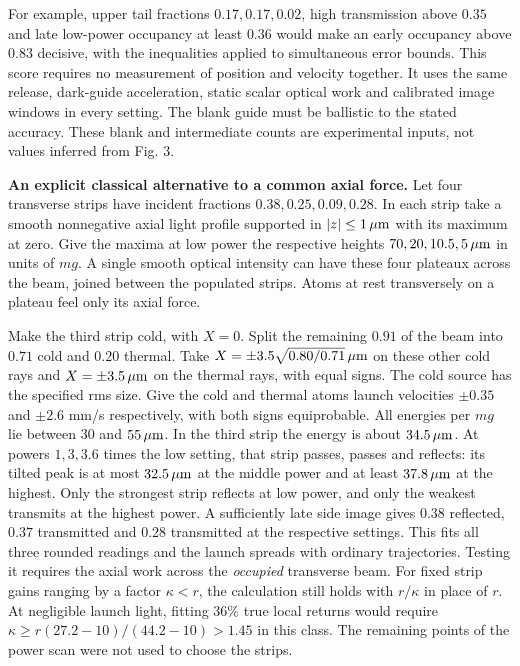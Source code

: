 \documentclass[11pt,a4paper]{article}
\begin{document}
For example, upper tail fractions \(0.17,0.17,0.02\), high transmission
above \(0.35\) and late low-power occupancy at least \(0.36\) would make
an early occupancy above \(0.83\) decisive, with the inequalities
applied to simultaneous error bounds. This score requires no measurement
of position and velocity together. It uses the same release, dark-guide
acceleration, static scalar optical work and calibrated image windows in
every setting. The blank guide must be ballistic to the stated accuracy.
These blank and intermediate counts are experimental inputs, not values
inferred from Fig. 3.

\textbf{An explicit classical alternative to a common axial force.} Let
four transverse strips have incident fractions \(0.38,0.25,0.09,0.28\).
In each strip take a smooth nonnegative axial light profile supported in
\(|z|\le1\,\mu{\rm m}\) with its maximum at zero. Give the maxima at low
power the respective heights \(70,20,10.5,5\,\mu{\rm m}\) in units of
\(mg\). A single smooth optical intensity can have these four plateaux
across the beam, joined between the populated strips. Atoms at rest
transversely on a plateau feel only its axial force.

Make the third strip cold, with \(X=0\). Split the remaining \(0.91\) of
the beam into \(0.71\) cold and \(0.20\) thermal. Take
\(X=\pm3.5\sqrt{0.80/0.71}\,\mu{\rm m}\) on these other cold rays and
\(X=\pm3.5\,\mu{\rm m}\) on the thermal rays, with equal signs. The cold
source has the specified rms size. Give the cold and thermal atoms
launch velocities \(\pm0.35\) and \(\pm2.6\) mm/s respectively, with
both signs equiprobable. All energies per \(mg\) lie between 30 and
\(55\,\mu{\rm m}\). In the third strip the energy is about
\(34.5\,\mu{\rm m}\). At powers \(1,3,3.6\) times the low setting, that
strip passes, passes and reflects: its tilted peak is at most
\(32.5\,\mu{\rm m}\) at the middle power and at least
\(37.8\,\mu{\rm m}\) at the highest. Only the strongest strip reflects
at low power, and only the weakest transmits at the highest power. A
sufficiently late side image gives \(0.38\) reflected, \(0.37\)
transmitted and \(0.28\) transmitted at the respective settings. This
fits all three rounded readings and the launch spreads with ordinary
trajectories. Testing it requires the axial work across the
\emph{occupied} transverse beam. For fixed strip gains ranging by a
factor \(\kappa<r\), the calculation still holds with \(r/\kappa\) in
place of \(r\). At negligible launch light, fitting 36\% true local
returns would require \(\kappa\ge r(27.2-10)/(44.2-10)>1.45\) in this
class. The remaining points of the power scan were not used to choose
the strips.
\end{document}
